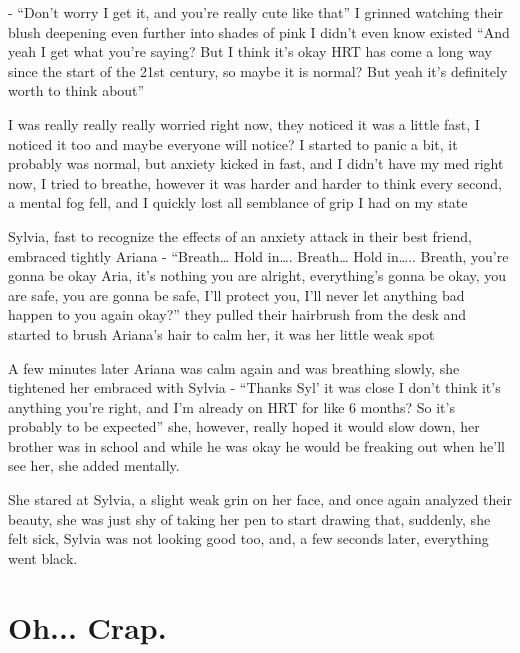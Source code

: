 \documentclass[colorlinks,12pt,a4paper]{book}
\begin{document}
- “Don't worry I get it, and you're really cute like that” 
I grinned watching their blush deepening even further into shades of pink I didn't even know existed
“And yeah I get what you're saying? But I think it's okay HRT has come a 
long way since the start of the 21st century, so maybe it is normal? But yeah it's definitely worth to think about”\par
\bigskip

I was really really really worried right now, 
they noticed it was a little fast, I noticed it too and maybe everyone will notice? 
I started to panic a bit, it probably was normal, but anxiety kicked in fast, and I didn't have my med right now,
 I tried to breathe, however it was harder and harder to think every second, a mental fog fell, and I quickly lost all
semblance of grip I had on my state\par
\bigskip

Sylvia, fast to recognize the effects of an anxiety attack in their best friend, embraced tightly Ariana\newline
- “Breath… Hold in…. Breath… Hold in….. Breath, you're gonna be okay Aria, 
it's nothing you are alright, everything's gonna be okay, you are safe, you are gonna be safe, I'll protect you, 
I'll never let anything bad happen to you again okay?” they pulled their hairbrush from the desk and started to 
brush Ariana's hair to calm her, it was her little weak spot\par
\bigskip

A few minutes later Ariana was calm again and was breathing slowly, she tightened her embraced with Sylvia\newline
- “Thanks Syl' it was close I don't think it's anything you're right, and I'm already on HRT for like 
6 months? So it's probably to be expected” she, however, really hoped it would slow down, her brother 
was in school and while he was okay he would be freaking out when he'll see her, she added mentally.\par
\bigskip

She stared at Sylvia, a slight weak grin on her face, and once again analyzed their beauty,
 she was just shy of taking her pen to start drawing that, suddenly, she felt sick,
Sylvia was not looking good too, and, a few seconds later, everything went black.


\chapter{Oh... Crap.}
\end{document}
